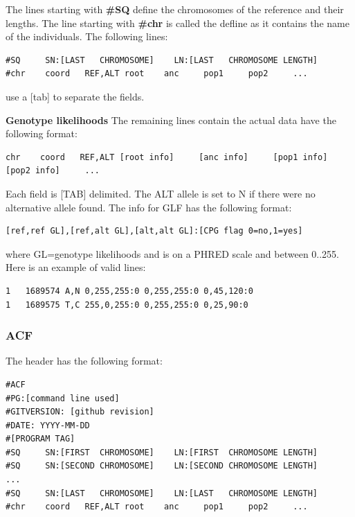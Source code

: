 \documentclass[a4paper]{article}
\begin{document}
\noindent The lines starting with {\bf \#SQ} define the chromosomes of the reference and their lengths. The line starting with {\bf \#chr} is called the defline as it contains the name of the individuals. The following lines:

\begin{lstlisting}
#SQ     SN:[LAST   CHROMOSOME]    LN:[LAST   CHROMOSOME LENGTH]
#chr    coord   REF,ALT root    anc     pop1     pop2     ...
\end{lstlisting}

\noindent use a [tab] to separate the fields. 

\noindent \textbf{Genotype likelihoods}
\noindent The remaining lines contain the actual data have the following format:

\begin{lstlisting}
chr    coord   REF,ALT [root info]     [anc info]     [pop1 info]     [pop2 info]     ...
\end{lstlisting}

\noindent  Each field is [TAB] delimited. The ALT allele is set to N if there were no alternative allele found. The info for GLF has the following format:

\begin{lstlisting}
[ref,ref GL],[ref,alt GL],[alt,alt GL]:[CPG flag 0=no,1=yes]
\end{lstlisting}

\noindent where GL=genotype likelihoods and is on a PHRED scale and between 0..255. Here is an example of valid lines:

\begin{lstlisting}
1	1689574	A,N	0,255,255:0	0,255,255:0	0,45,120:0
1	1689575	T,C	255,0,255:0	0,255,255:0	0,25,90:0
\end{lstlisting}

\subsubsection{ACF} 

\label{text:acf}
\noindent The header has the following format:

\begin{lstlisting}
#ACF
#PG:[command line used]
#GITVERSION: [github revision]
#DATE: YYYY-MM-DD
#[PROGRAM TAG]
#SQ     SN:[FIRST  CHROMOSOME]    LN:[FIRST  CHROMOSOME LENGTH]
#SQ     SN:[SECOND CHROMOSOME]    LN:[SECOND CHROMOSOME LENGTH]
...
#SQ     SN:[LAST   CHROMOSOME]    LN:[LAST   CHROMOSOME LENGTH]
#chr    coord   REF,ALT root    anc     pop1     pop2     ...
\end{lstlisting}
\end{document}
